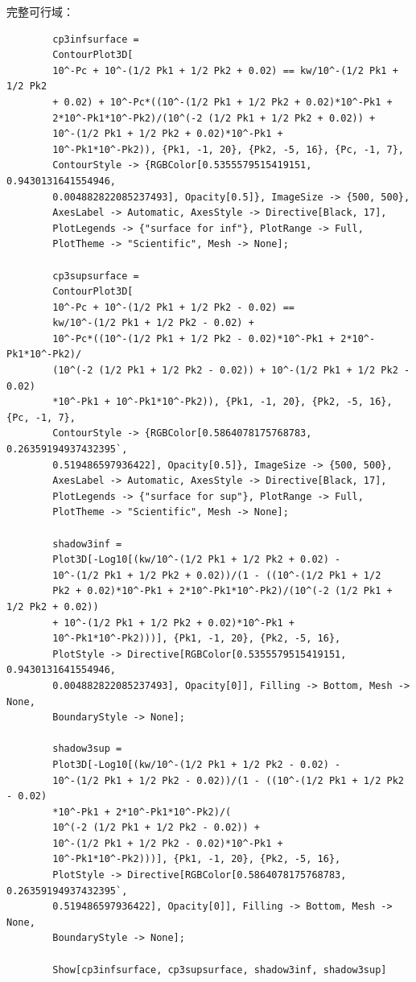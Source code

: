 \documentclass[UTF-8]{ctexart}
\newcommand{\0}{\boldsymbol{0}}
\begin{document}
    完整可行域：
    \begin{lstlisting}
        cp3infsurface = 
        ContourPlot3D[
        10^-Pc + 10^-(1/2 Pk1 + 1/2 Pk2 + 0.02) == kw/10^-(1/2 Pk1 + 1/2 Pk2 
        + 0.02) + 10^-Pc*((10^-(1/2 Pk1 + 1/2 Pk2 + 0.02)*10^-Pk1 + 
        2*10^-Pk1*10^-Pk2)/(10^(-2 (1/2 Pk1 + 1/2 Pk2 + 0.02)) + 
        10^-(1/2 Pk1 + 1/2 Pk2 + 0.02)*10^-Pk1 + 
        10^-Pk1*10^-Pk2)), {Pk1, -1, 20}, {Pk2, -5, 16}, {Pc, -1, 7}, 
        ContourStyle -> {RGBColor[0.5355579515419151, 0.9430131641554946, 
        0.004882822085237493], Opacity[0.5]}, ImageSize -> {500, 500}, 
        AxesLabel -> Automatic, AxesStyle -> Directive[Black, 17], 
        PlotLegends -> {"surface for inf"}, PlotRange -> Full, 
        PlotTheme -> "Scientific", Mesh -> None];

        cp3supsurface = 
        ContourPlot3D[
        10^-Pc + 10^-(1/2 Pk1 + 1/2 Pk2 - 0.02) == 
        kw/10^-(1/2 Pk1 + 1/2 Pk2 - 0.02) + 
        10^-Pc*((10^-(1/2 Pk1 + 1/2 Pk2 - 0.02)*10^-Pk1 + 2*10^-Pk1*10^-Pk2)/
        (10^(-2 (1/2 Pk1 + 1/2 Pk2 - 0.02)) + 10^-(1/2 Pk1 + 1/2 Pk2 - 0.02)
        *10^-Pk1 + 10^-Pk1*10^-Pk2)), {Pk1, -1, 20}, {Pk2, -5, 16}, {Pc, -1, 7}, 
        ContourStyle -> {RGBColor[0.5864078175768783, 0.26359194937432395`,
        0.519486597936422], Opacity[0.5]}, ImageSize -> {500, 500}, 
        AxesLabel -> Automatic, AxesStyle -> Directive[Black, 17], 
        PlotLegends -> {"surface for sup"}, PlotRange -> Full, 
        PlotTheme -> "Scientific", Mesh -> None];

        shadow3inf = 
        Plot3D[-Log10[(kw/10^-(1/2 Pk1 + 1/2 Pk2 + 0.02) - 
        10^-(1/2 Pk1 + 1/2 Pk2 + 0.02))/(1 - ((10^-(1/2 Pk1 + 1/2 
        Pk2 + 0.02)*10^-Pk1 + 2*10^-Pk1*10^-Pk2)/(10^(-2 (1/2 Pk1 + 1/2 Pk2 + 0.02)) 
        + 10^-(1/2 Pk1 + 1/2 Pk2 + 0.02)*10^-Pk1 + 
        10^-Pk1*10^-Pk2)))], {Pk1, -1, 20}, {Pk2, -5, 16}, 
        PlotStyle -> Directive[RGBColor[0.5355579515419151, 0.9430131641554946, 
        0.004882822085237493], Opacity[0]], Filling -> Bottom, Mesh -> None, 
        BoundaryStyle -> None];

        shadow3sup = 
        Plot3D[-Log10[(kw/10^-(1/2 Pk1 + 1/2 Pk2 - 0.02) - 
        10^-(1/2 Pk1 + 1/2 Pk2 - 0.02))/(1 - ((10^-(1/2 Pk1 + 1/2 Pk2 - 0.02)
        *10^-Pk1 + 2*10^-Pk1*10^-Pk2)/(
        10^(-2 (1/2 Pk1 + 1/2 Pk2 - 0.02)) + 
        10^-(1/2 Pk1 + 1/2 Pk2 - 0.02)*10^-Pk1 + 
        10^-Pk1*10^-Pk2)))], {Pk1, -1, 20}, {Pk2, -5, 16}, 
        PlotStyle -> Directive[RGBColor[0.5864078175768783, 0.26359194937432395`,
        0.519486597936422], Opacity[0]], Filling -> Bottom, Mesh -> None, 
        BoundaryStyle -> None];

        Show[cp3infsurface, cp3supsurface, shadow3inf, shadow3sup]
    \end{lstlisting}
\end{document}
